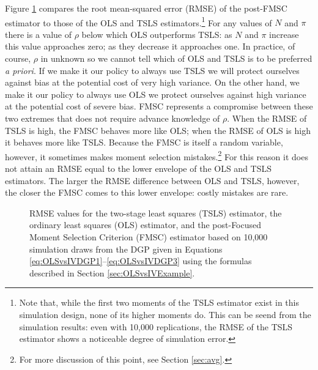 Figure \ref{fig:OLSvsIV_RMSEbaseline} compares the root mean-squared error (RMSE) of the post-FMSC estimator to those of the OLS and TSLS estimators.\footnote{Note that, while the first two moments of the TSLS estimator exist in this simulation design, none of its higher moments do.
This can be seend from the simulation results: even with 10,000 replications, the RMSE of the TSLS estimator shows a noticeable degree of simulation error.}
For any values of $N$ and $\pi$ there is a value of $\rho$ below which OLS outperforms TSLS: as $N$ and $\pi$ increase this value approaches zero; as they decrease it approaches one.
In practice, of course, $\rho$ in unknown so we cannot tell which of OLS and TSLS is to be preferred \emph{a priori}.
If we make it our policy to always use TSLS we will protect ourselves against bias at the potential cost of very high variance.
On the other hand, we make it our policy to always use OLS we protect ourselves against high variance at the potential cost of severe bias. 
FMSC represents a compromise between these two extremes that does not require advance knowledge of $\rho$. 
When the RMSE of TSLS is high, the FMSC behaves more like OLS; when the RMSE of OLS is high it behaves more like TSLS.
Because the FMSC is itself a random variable, however, it sometimes makes moment selection mistakes.\footnote{For more discussion of this point, see Section \ref{sec:avg}.} 
For this reason it does not attain an RMSE equal to the lower envelope of the OLS and TSLS estimators.
The larger the RMSE difference between OLS and TSLS, however, the closer the FMSC comes to this lower envelope: costly mistakes are rare.

\begin{figure}
\centering
	
	\caption{RMSE values for the two-stage least squares (TSLS) estimator, the ordinary least squares (OLS) estimator, and the post-Focused Moment Selection Criterion (FMSC) estimator based on 10,000 simulation draws from the DGP given in Equations \ref{eq:OLSvsIVDGP1}--\ref{eq:OLSvsIVDGP3} using the formulas described in Section \ref{sec:OLSvsIVExample}.}
	\label{fig:OLSvsIV_RMSEbaseline}
\end{figure}

